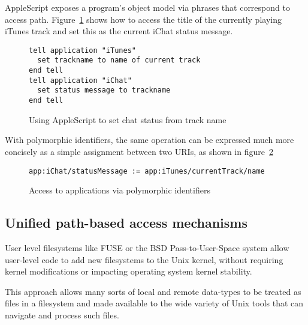 \documentclass[preprint,authoryear]{acm_proc_article-sp}
\begin{document}
AppleScript\cite{applescript-hopl3} exposes a program's object model via
phrases that correspond to access path.  Figure~\ref{AppleScript} shows 
how to access the title of the currently playing iTunes track and set this
as the current iChat status message.


\begin{figure}[htbp]
\begin{center}
\begin{small}
\begin{verbatim}
tell application "iTunes"
  set trackname to name of current track
end tell
tell application "iChat"
  set status message to trackname
end tell
\end{verbatim}
\end{small}
\caption{Using AppleScript to set chat status from track name}
\label{AppleScript}
\end{center}
\end{figure}

With polymorphic identifiers, the same operation can be expressed
much more concisely as a simple assignment between two URIs,
as shown in figure~\ref{NonAppleScript}

\begin{figure}[htbp]
\begin{center}
\begin{small}
\begin{verbatim}
app:iChat/statusMessage := app:iTunes/currentTrack/name
\end{verbatim}
\end{small}
\caption{Access to applications via polymorphic identifiers}
\label{NonAppleScript}
\end{center}
\end{figure}



\subsection{Unified path-based access mechanisms}


User level filesystems like FUSE\cite{fuse} or the BSD Pass-to-User-Space\cite{puffs} 
system allow
user-level code to add new filesystems to the Unix kernel, without requiring
kernel modifications or impacting operating system kernel stability.

This approach allows many sorts of local and remote data-types to be 
treated as files in a filesystem and made available to the wide variety
of Unix tools that can navigate and process such files.  
\end{document}
